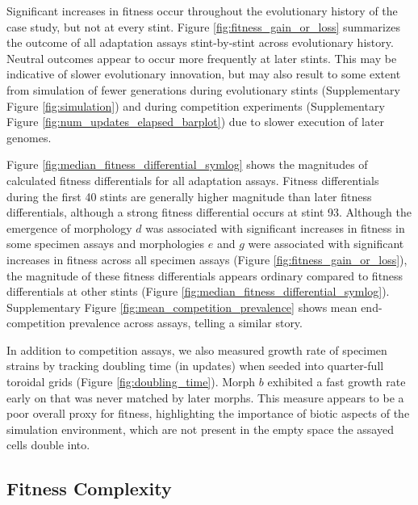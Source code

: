 

Significant increases in fitness occur throughout the evolutionary history of the case study, but not at every stint.
Figure \ref{fig:fitness_gain_or_loss} summarizes the outcome of all adaptation assays stint-by-stint across evolutionary history.
Neutral outcomes appear to occur more frequently at later stints.
This may be indicative of slower evolutionary innovation, but may also result to some extent from simulation of fewer generations during evolutionary stints (Supplementary Figure \ref{fig:simulation}) and during competition experiments (Supplementary Figure \ref{fig:num_updates_elapsed_barplot}) due to slower execution of later genomes.



Figure \ref{fig:median_fitness_differential_symlog} shows the magnitudes of calculated fitness differentials for all adaptation assays.
Fitness differentials during the first 40 stints are generally higher magnitude than later fitness differentials, although a strong fitness differential occurs at stint 93.
Although the emergence of morphology $d$ was associated with significant increases in fitness in some specimen assays and morphologies $e$ and $g$ were associated with significant increases in fitness across all specimen assays (Figure \ref{fig:fitness_gain_or_loss}), the magnitude of these fitness differentials appears ordinary compared to fitness differentials at other stints (Figure \ref{fig:median_fitness_differential_symlog}).
Supplementary Figure \ref{fig:mean_competition_prevalence} shows mean end-competition prevalence across assays, telling a similar story.



In addition to competition assays, we also measured growth rate of specimen strains by tracking doubling time (in updates) when seeded into quarter-full toroidal grids (Figure \ref{fig:doubling_time}).
Morph $b$ exhibited a fast growth rate early on that was never matched by later morphs.
This measure appears to be a poor overall proxy for fitness, highlighting the importance of biotic aspects of the simulation environment, which are not present in the empty space the assayed cells double into.


\subsection{Fitness Complexity}

